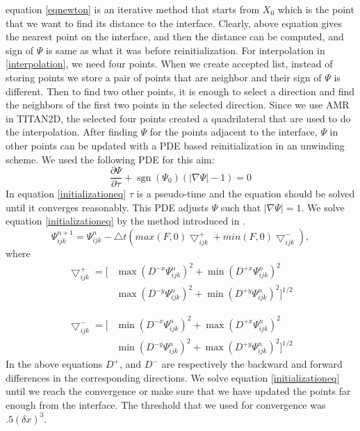 \documentclass[letterpaper,10pt]{article}
\DeclareMathOperator{\sgn}{sgn}
\begin{document}
equation \eqref{eqnewton} is an iterative method that starts from $X_0$ which is the point that we want to find its distance to the interface. Clearly, above equation gives the nearest point on the interface, and then the distance can be computed, and sign of $\varPsi$ is same as what it was before reinitialization.
For interpolation in \eqref{interpolation}, we need four points. When we create accepted list, instead of storing points we store a pair of points that are neighbor and their sign of $\varPsi$ is different. Then to find two other points, it is enough to select a direction and find the neighbors of the first two points in the selected direction. Since we use AMR in TITAN2D, the selected four points created a quadrilateral that are used to do the interpolation.
After finding $\varPsi$ for the points adjacent to the interface, $\varPsi$ in other points can be updated with a PDE based reinitialization in an unwinding scheme. We used the following PDE for this aim:
\begin{equation}\label{initializationeq}
        \frac{\partial \varPsi}{\partial \tau} + \sgn (\varPsi_0) (|\nabla \varPsi| - 1)= 0 
\end{equation}
In equation \eqref{initializationeq} $\tau$ is a pseudo-time and the equation should be solved until it converges reasonably. This PDE adjusts $\varPsi$ such that $|\nabla \varPsi|=1$.
We solve equation \eqref{initializationeq} by the method introduced in \cite{Adalsteinsson1999}. 
\begin{equation}
        \varPsi_{ijk}^{n+1}=\varPsi_{ijk}^{n}-\bigtriangleup t \left(max(F,0)\bigtriangledown_{ijk}^{+}+min(F,0)\bigtriangledown_{ijk}^{-} \right),
\end{equation}
where 
\begin{equation}
        \begin{aligned}
                \bigtriangledown_{ijk}^{+} = \big[ & \max(D^{-x}\varPsi_{ijk}^{n})^2 + \min(D^{+x}\varPsi_{ijk}^{n})^2
                \\& \max(D^{-y}\varPsi_{ijk}^{n})^2 + \min(D^{+y}\varPsi_{ijk}^{n})^2 \big]^{1/2}
        \end{aligned}
\end{equation}
 
\begin{equation}
        \begin{aligned}
                \bigtriangledown_{ijk}^{-} = \big[ & \min(D^{-x}\varPsi_{ijk}^{n})^2 + \max(D^{+x}\varPsi_{ijk}^{n})^2
                \\& \min(D^{-y}\varPsi_{ijk}^{n})^2 + \max(D^{+y}\varPsi_{ijk}^{n})^2 \big]^{1/2}
        \end{aligned}
\end{equation} 
In the above equations $D^+$, and $D^-$ are  respectively the backward and forward differences in the corresponding directions.
We solve equation \eqref{initializationeq} until we reach the convergence or make sure that we have updated the points far enough from the interface. The threshold that we used for convergence was $.5 (\delta x)^3$.
\end{document}
